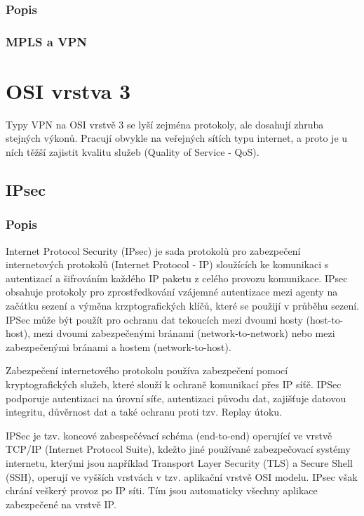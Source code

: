 \documentclass[thesis=B,czech]{FITthesis}[2012/06/26]
\begin{document}
      \subsubsection{Popis}

      \subsubsection{MPLS a VPN}

  \section{OSI vrstva 3}

    Typy VPN na OSI vrstvě 3 se lyší zejména protokoly, ale dosahují zhruba stejných výkonů. Pracují obvykle na veřejných sítích typu internet, a proto je u ních těžší zajistit kvalitu služeb (Quality of Service - QoS).

    \subsection{IPsec}

      \subsubsection{Popis}
        Internet Protocol Security (IPsec) je sada protokolů pro zabezpečení internetových protokolů (Internet Protocol - IP) sloužících ke komunikaci s autentizací a šifrováním každého IP paketu z celého provozu komunikace. IPsec obsahuje protokoly pro zprostředkování vzájemné autentizace mezi agenty na začátku sezení a výměna krzptografických klíčů, které se použijí v průběhu sezení. IPSec může být použít pro ochranu dat tekoucích mezi dvoumi hosty (host-to-host), mezi dvoumi zabezpečenými bránami (network-to-network) nebo mezi zabezpečenými bránami a hostem (network-to-host).

        Zabezpečení internetového protokolu používa zabezpečení pomocí kryptografických služeb, které slouží k ochraně komunikací přes IP síťě. IPSec podporuje autentizaci na úrovní síťe, autentizaci původu dat, zajišťuje datovou integritu, důvěrnost dat a také ochranu proti tzv. Replay útoku.

        IPSec je tzv. koncové zabespečévací schéma (end-to-end) operující ve vrstvě TCP/IP (Internet Protocol Suite), kdežto jiné používané zabezpečovací systémy internetu, kterými jsou například Transport Layer Security (TLS) a Secure Shell (SSH), operují ve vyšších vrstvách v tzv. aplikační vrstvě OSI modelu. IPsec však chrání veškerý provoz po IP síti. Tím jsou automaticky všechny aplikace zabezpečené na vrstvě IP.
        \cite{ipsec_basics}
\end{document}

